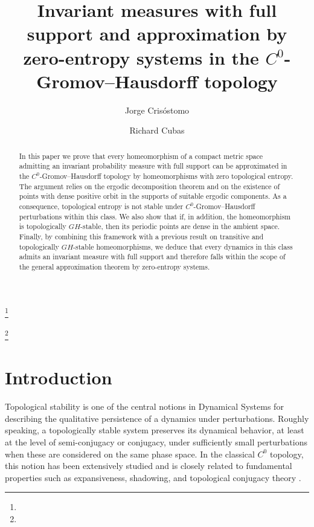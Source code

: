 \documentclass{amsart}
\numberwithin{equation}{section}
\theoremstyle{remark}
\begin{document}
\title[Approximation by zero-entropy systems]{Invariant measures with full support and approximation by zero-entropy systems in the $C^0$-Gromov--Hausdorff topology}

\author{Jorge Crisóstomo}
\address{Facultad de Ciencias Matemáticas, UNMSM, Lima, Perú}
\thanks{}
 
 


\author{Richard Cubas}
\address{Universidad Científica del Sur, Lima, Perú}
\curraddr{}
\thanks{}

\date{}

\begin{abstract}
In this paper we prove that every homeomorphism of a compact metric space admitting an invariant probability measure with full support can be approximated in the $C^0$-Gromov--Hausdorff topology by homeomorphisms with zero topological entropy. The argument relies on the ergodic decomposition theorem and on the existence of points with dense positive orbit in the supports of suitable ergodic components. As a consequence, topological entropy is not stable under $C^0$-Gromov--Hausdorff perturbations within this class. We also show that if, in addition, the homeomorphism is topologically $GH$-stable, then its periodic points are dense in the ambient space. Finally, by combining this framework with a previous result on transitive and topologically $GH$-stable homeomorphisms, we deduce that every dynamics in this class admits an invariant measure with full support and therefore falls within the scope of the general approximation theorem by zero-entropy systems.
\end{abstract}

\maketitle

\section{Introduction}

Topological stability is one of the central notions in Dynamical Systems for describing the qualitative persistence of a dynamics under perturbations. Roughly speaking, a topologically stable system preserves its dynamical behavior, at least at the level of semi-conjugacy or conjugacy, under sufficiently small perturbations when these are considered on the same phase space. In the classical $C^0$ topology, this notion has been extensively studied and is closely related to fundamental properties such as expansiveness, shadowing, and topological conjugacy theory \cite{walters1970,walters1978,katokhasselblatt1995,robinson1999}.
\end{document}
